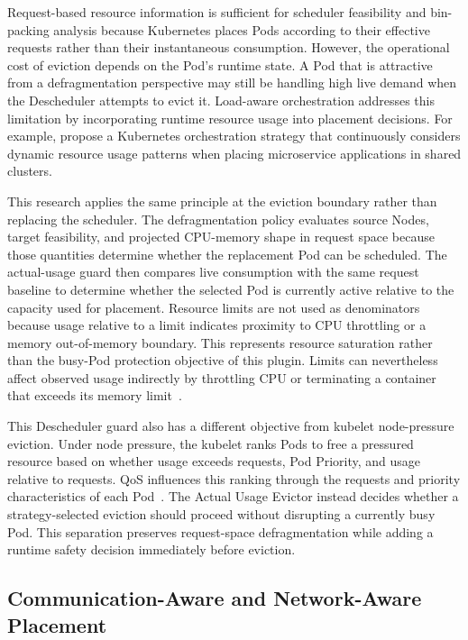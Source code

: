 Request-based resource information is sufficient for scheduler feasibility and bin-packing analysis because Kubernetes places Pods according to their effective requests rather than their instantaneous consumption. However, the operational cost of eviction depends on the Pod's runtime state. A Pod that is attractive from a defragmentation perspective may still be handling high live demand when the Descheduler attempts to evict it. Load-aware orchestration addresses this limitation by incorporating runtime resource usage into placement decisions. For example, \cite{marchese2024loadaware} propose a Kubernetes orchestration strategy that continuously considers dynamic resource usage patterns when placing microservice applications in shared clusters.

This research applies the same principle at the eviction boundary rather than replacing the scheduler. The defragmentation policy evaluates source Nodes, target feasibility, and projected CPU-memory shape in request space because those quantities determine whether the replacement Pod can be scheduled. The actual-usage guard then compares live consumption with the same request baseline to determine whether the selected Pod is currently active relative to the capacity used for placement. Resource limits are not used as denominators because usage relative to a limit indicates proximity to CPU throttling or a memory out-of-memory boundary. This represents resource saturation rather than the busy-Pod protection objective of this plugin. Limits can nevertheless affect observed usage indirectly by throttling CPU or terminating a container that exceeds its memory limit~\cite{k8s_resource_management}.

This Descheduler guard also has a different objective from kubelet node-pressure eviction. Under node pressure, the kubelet ranks Pods to free a pressured resource based on whether usage exceeds requests, Pod Priority, and usage relative to requests. QoS influences this ranking through the requests and priority characteristics of each Pod~\cite{k8s_node_pressure_eviction}. The Actual Usage Evictor instead decides whether a strategy-selected eviction should proceed without disrupting a currently busy Pod. This separation preserves request-space defragmentation while adding a runtime safety decision immediately before eviction.

\subsection{Communication-Aware and Network-Aware Placement}
\label{sec:networkAwareScheduling}

